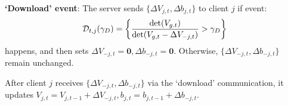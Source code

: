 \noindent \textbf{`Download' event}: The server sends $\{\Delta V_{j,t},\Delta b_{j,t}\}$ to client $j$ if event:
    \begin{equation}\label{eq:download}
        \mathcal{D}_{t,j}(\gamma_{D})=\left\{\frac{\det(V_{g.t})}{\det(V_{g,t}-\Delta V_{-j,t})} > \gamma_{D}\right\}
    \end{equation}
happens, and then sets $\Delta V_{-j,t}=\textbf{0},\Delta b_{-j,t}=\textbf{0}$. Otherwise, $\{\Delta V_{-j,t}, \Delta b_{-j,t}\}$ remain unchanged.

After client $j$ receives $\{\Delta V_{-j,t},\Delta b_{-j,t}\}$ via the `download' communication, it updates $V_{j,t}=V_{j,t-1}+\Delta V_{-j,t},b_{j,t}=b_{j,t-1}+\Delta b_{-j,t}$.
